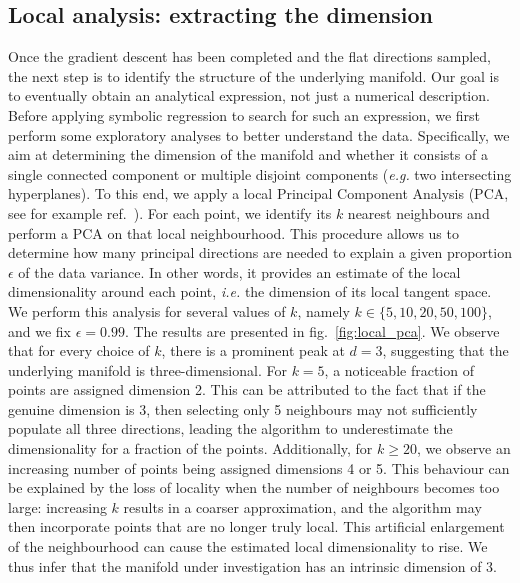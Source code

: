 \documentclass[11pt,a4paper]{article}
\begin{document}
	\subsection{Local analysis: extracting the dimension}
	Once the gradient descent has been completed and the flat directions sampled, the next step is to identify the structure of the underlying manifold. Our goal is to eventually obtain an analytical expression, not just a numerical description. Before applying symbolic regression to search for such an expression, we first perform some exploratory analyses to better understand the data. Specifically, we aim at determining the dimension of the manifold and whether it consists of a single connected component or multiple disjoint components (\textit{e.g.} two intersecting hyperplanes). To this end, we apply a local Principal Component Analysis (PCA,%
see for example ref.~\cite{scikit-learn}). For each point, we identify its $k$ nearest neighbours and perform a PCA on that local neighbourhood. This procedure allows us to determine how many principal directions are needed to explain a given proportion $\epsilon$ of the data variance. In other words, it provides an estimate of the local dimensionality around each point, \textit{i.e.} the dimension of its local tangent space. We perform this analysis for several values of $k$, namely $k \in \{5, 10, 20, 50, 100\}$, and we fix $\epsilon = 0.99$. The results are presented in fig.~\ref{fig:local_pca}. We observe that for every choice of $k$, there is a prominent peak at $d = 3$, suggesting that the underlying manifold is three-dimensional. For $k = 5$, a noticeable fraction of points are assigned dimension 2. This can be attributed to the fact that if the genuine dimension is 3, then selecting only 5 neighbours may not sufficiently populate all three directions, leading the algorithm to underestimate the dimensionality for a fraction of the points. Additionally, for $k \geq 20$, we observe an increasing number of points being assigned dimensions 4 or 5. This behaviour can be explained by the loss of locality when the number of neighbours becomes too large: increasing $k$ results in a coarser approximation, and the algorithm may then incorporate points that are no longer truly local. This artificial enlargement of the neighbourhood can cause the estimated local dimensionality to rise. We thus infer that the manifold under investigation has an intrinsic dimension of 3.
\end{document}
